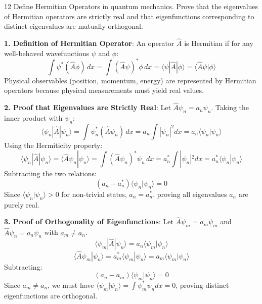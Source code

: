 \begin{theoryq}{12}
Define Hermitian Operators in quantum mechanics. Prove that the eigenvalues of Hermitian operators are strictly real and that eigenfunctions corresponding to distinct eigenvalues are mutually orthogonal.
\end{theoryq}
\begin{theorysol}
\textbf{1. Definition of Hermitian Operator}:
An operator $\hat{A}$ is Hermitian if for any well-behaved wavefunctions $\psi$ and $\phi$:
\begin{equation}
\int \psi^* (\hat{A} \phi)\, dx = \int (\hat{A}\psi)^* \phi\, dx = \langle \psi | \hat{A} | \phi \rangle = \langle \hat{A}\psi | \phi \rangle
\end{equation}
Physical observables (position, momentum, energy) are represented by Hermitian operators because physical measurements must yield real values.

\textbf{2. Proof that Eigenvalues are Strictly Real}:
Let $\hat{A}\psi_n = a_n \psi_n$.
Taking the inner product with $\psi_n$:
\begin{equation}
\langle \psi_n | \hat{A} | \psi_n \rangle = \int \psi_n^* (\hat{A} \psi_n)\, dx = a_n \int |\psi_n|^2 dx = a_n \langle \psi_n | \psi_n \rangle
\end{equation}
Using the Hermiticity property:
\begin{equation}
\langle \psi_n | \hat{A} | \psi_n \rangle = \langle \hat{A}\psi_n | \psi_n \rangle = \int (\hat{A}\psi_n)^* \psi_n\, dx = a_n^* \int |\psi_n|^2 dx = a_n^* \langle \psi_n | \psi_n \rangle
\end{equation}
Subtracting the two relations:
\begin{equation}
(a_n - a_n^*) \langle \psi_n | \psi_n \rangle = 0
\end{equation}
Since $\langle \psi_n | \psi_n \rangle > 0$ for non-trivial states, $a_n = a_n^*$, proving all eigenvalues $a_n$ are purely real.

\textbf{3. Proof of Orthogonality of Eigenfunctions}:
Let $\hat{A}\psi_m = a_m \psi_m$ and $\hat{A}\psi_n = a_n \psi_n$ with $a_m \ne a_n$.
\begin{equation}
\langle \psi_m | \hat{A} | \psi_n \rangle = a_n \langle \psi_m | \psi_n \rangle
\end{equation}
\begin{equation}
\langle \hat{A}\psi_m | \psi_n \rangle = a_m^* \langle \psi_m | \psi_n \rangle = a_m \langle \psi_m | \psi_n \rangle
\end{equation}
Subtracting:
\begin{equation}
(a_n - a_m) \langle \psi_m | \psi_n \rangle = 0
\end{equation}
Since $a_m \ne a_n$, we must have $\langle \psi_m | \psi_n \rangle = \int \psi_m^* \psi_n dx = 0$, proving distinct eigenfunctions are orthogonal.
\end{theorysol}
\vspace{4mm}

